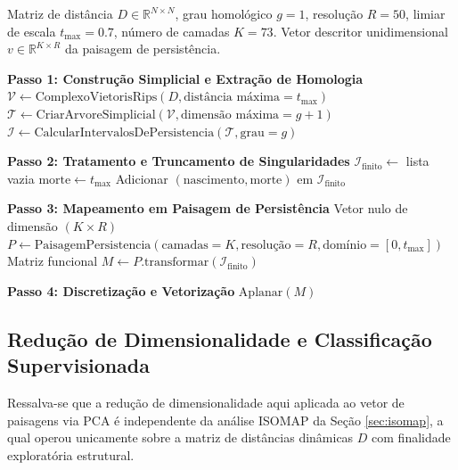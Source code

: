 \documentclass[12pt, a4paper]{article}
\theoremstyle{plain}
\theoremstyle{definition}
\theoremstyle{remark}
\newcommand{\ident}{\hspace{2em}}
\begin{document}
\begin{algorithm}[H]
\caption{Computação de Paisagens de Persistência em Espaço de Banach}
\label{alg:landscapes}
\begin{algorithmic}[1]
\Require Matriz de distância $D \in \mathbb{R}^{N \times N}$, grau homológico $g=1$, resolução $R=50$, limiar de escala $t_{\max}=0.7$, número de camadas $K=73$.
\Ensure Vetor descritor unidimensional $v \in \mathbb{R}^{K \times R}$ da paisagem de persistência.

\Statex \textbf{Passo 1: Construção Simplicial e Extração de Homologia}
\State $\mathcal{V} \leftarrow \text{ComplexoVietorisRips}(D, \text{distância máxima} = t_{\max})$
\State $\mathcal{T} \leftarrow \text{CriarArvoreSimplicial}(\mathcal{V}, \text{dimensão máxima} = g+1)$
\State $\mathcal{I} \leftarrow \text{CalcularIntervalosDePersistencia}(\mathcal{T}, \text{grau} = g)$

\Statex \textbf{Passo 2: Tratamento e Truncamento de Singularidades}
\State $\mathcal{I}_{\text{finito}} \leftarrow$ lista vazia
        \State $\text{morte} \leftarrow t_{\max}$
    \EndIf
    \State Adicionar $(\text{nascimento}, \text{morte})$ em $\mathcal{I}_{\text{finito}}$
\EndFor

\Statex \textbf{Passo 3: Mapeamento em Paisagem de Persistência}
    \State \Return Vetor nulo de dimensão $(K \times R)$
\EndIf
\State $P \leftarrow \text{PaisagemPersistencia}(\text{camadas} = K, \text{resolução} = R, \text{domínio} = [0, t_{\max}])$
\State Matriz funcional $M \leftarrow P.\text{transformar}(\mathcal{I}_{\text{finito}})$

\Statex \textbf{Passo 4: Discretização e Vetorização}
\State \Return $\text{Aplanar}(M)$ 
\end{algorithmic}
\end{algorithm}

\subsection{Redução de Dimensionalidade e Classificação Supervisionada}

\ident Ressalva-se que a redução de dimensionalidade aqui aplicada ao vetor de paisagens via PCA é independente da análise ISOMAP da Seção \ref{sec:isomap}, a qual operou unicamente sobre a matriz de distâncias dinâmicas $D$ com finalidade exploratória estrutural.
\end{document}
